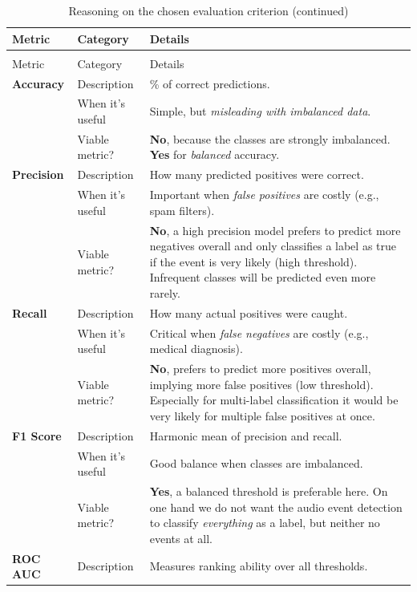 \documentclass{article}
\begin{document}
\begin{xltabular}{\linewidth}{llX}
\caption{Reasoning on the chosen evaluation criterion}
\label{tab:metrics}\\
\toprule
Metric & Category & Details \\
\midrule
\endfirsthead
\caption[]{Reasoning on the chosen evaluation criterion (continued)}\\
\toprule
Metric & Category & Details \\
\midrule
\endhead
\bottomrule
\endfoot

\textbf{Accuracy}
& Description      & \% of correct predictions. \\
& When it's useful & Simple, but \emph{misleading with imbalanced data}. \\
& Viable metric?   & \textbf{No}, because the classes are strongly imbalanced. \textbf{Yes} for \emph{balanced} accuracy. \\
\midrule
\textbf{Precision}
& Description      & How many predicted positives were correct. \\
& When it's useful & Important when \emph{false positives} are costly (e.g., spam filters). \\
& Viable metric?   & \textbf{No}, a high precision model prefers to predict more negatives overall and only classifies a label as true if the event is very likely (high threshold). Infrequent classes will be predicted even more rarely. \\
\midrule
\textbf{Recall}
& Description      & How many actual positives were caught. \\
& When it's useful & Critical when \emph{false negatives} are costly (e.g., medical diagnosis). \\
& Viable metric?   & \textbf{No}, prefers to predict more positives overall, implying more false positives (low threshold). Especially for multi-label classification it would be very likely for multiple false positives at once. \\
\midrule
\textbf{F1 Score}
& Description      & Harmonic mean of precision and recall. \\
& When it's useful & Good balance when classes are imbalanced. \\
& Viable metric?   & \textbf{Yes}, a balanced threshold is preferable here. On one hand we do not want the audio event detection to classify \emph{everything} as a label, but neither no events at all. \\
\midrule
\textbf{ROC AUC}
& Description      & Measures ranking ability over all thresholds. \\

\end{xltabular}
\end{document}
